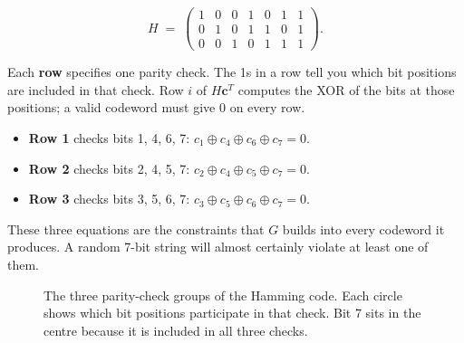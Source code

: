 \documentclass[11pt, a4paper]{article}
\theoremstyle{definition}
\theoremstyle{plain}
\theoremstyle{remark}
\begin{document}
\[
  H \;=\;
  \begin{pmatrix}
    1 & 0 & 0 & 1 & 0 & 1 & 1 \\
    0 & 1 & 0 & 1 & 1 & 0 & 1 \\
    0 & 0 & 1 & 0 & 1 & 1 & 1
  \end{pmatrix}.
\]

Each \textbf{row} specifies one parity check.  The 1s in a row tell
you which bit positions are included in that check.  Row $i$ of
$H\mathbf{c}^T$ computes the XOR of the bits at those positions; a
valid codeword must give 0 on every row.

\begin{itemize}
  \item \textbf{Row 1} checks bits 1, 4, 6, 7:\quad
        $c_1 \oplus c_4 \oplus c_6 \oplus c_7 = 0$.
  \item \textbf{Row 2} checks bits 2, 4, 5, 7:\quad
        $c_2 \oplus c_4 \oplus c_5 \oplus c_7 = 0$.
  \item \textbf{Row 3} checks bits 3, 5, 6, 7:\quad
        $c_3 \oplus c_5 \oplus c_6 \oplus c_7 = 0$.
\end{itemize}

These three equations are the constraints that $G$ builds into every
codeword it produces.  A random 7-bit string will almost certainly
violate at least one of them.

\begin{figure}[h]
\centering
{}
\caption{The three parity-check groups of the Hamming code.  Each
circle shows which bit positions participate in that check.  Bit 7
sits in the centre because it is included in all three checks.}
\label{fig:hamming_venn}
\end{figure}
\end{document}
